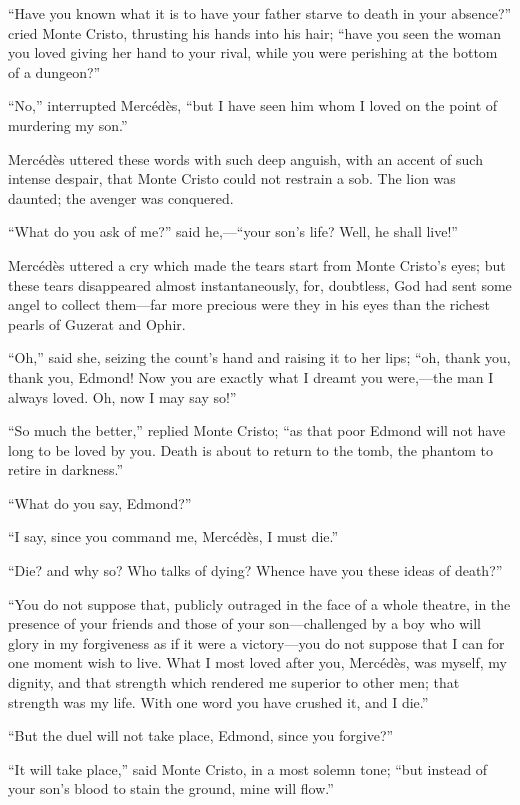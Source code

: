 “Have you known what it is to have your father starve to death in your
absence?” cried Monte Cristo, thrusting his hands into his hair; “have
you seen the woman you loved giving her hand to your rival, while you
were perishing at the bottom of a dungeon?”

“No,” interrupted Mercédès, “but I have seen him whom I loved on the
point of murdering my son.”

Mercédès uttered these words with such deep anguish, with an accent of
such intense despair, that Monte Cristo could not restrain a sob. The
lion was daunted; the avenger was conquered.

“What do you ask of me?” said he,—“your son’s life? Well, he shall
live!”

Mercédès uttered a cry which made the tears start from Monte Cristo’s
eyes; but these tears disappeared almost instantaneously, for,
doubtless, God had sent some angel to collect them—far more precious
were they in his eyes than the richest pearls of Guzerat and Ophir.

“Oh,” said she, seizing the count’s hand and raising it to her lips;
“oh, thank you, thank you, Edmond! Now you are exactly what I dreamt
you were,—the man I always loved. Oh, now I may say so!”

“So much the better,” replied Monte Cristo; “as that poor Edmond will
not have long to be loved by you. Death is about to return to the tomb,
the phantom to retire in darkness.”

“What do you say, Edmond?”

“I say, since you command me, Mercédès, I must die.”

“Die? and why so? Who talks of dying? Whence have you these ideas of
death?”

“You do not suppose that, publicly outraged in the face of a whole
theatre, in the presence of your friends and those of your
son—challenged by a boy who will glory in my forgiveness as if it were
a victory—you do not suppose that I can for one moment wish to live.
What I most loved after you, Mercédès, was myself, my dignity, and that
strength which rendered me superior to other men; that strength was my
life. With one word you have crushed it, and I die.”

“But the duel will not take place, Edmond, since you forgive?”

“It will take place,” said Monte Cristo, in a most solemn tone; “but
instead of your son’s blood to stain the ground, mine will flow.”

